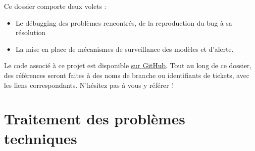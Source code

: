 \documentclass[french]{article}
\begin{document}
    Ce dossier comporte deux volets :
    \begin{itemize}
        \item Le débugging des problèmes rencontrés, de la reproduction du bug à sa résolution
        \item La mise en place de mécanismes de surveillance des modèles et d'alerte.
    \end{itemize}
    Le code associé à ce projet est disponible \href{https://github.com/vinpap/mathfinder}{sur GitHub}. Tout au long de ce dossier, des références seront faites à des noms de branche ou identifiants de tickets, avec les liens correspondants. N'hésitez pas à vous y référer !

    \section{Traitement des problèmes techniques}
\end{document}
